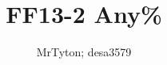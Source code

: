 \documentclass[dvipsnames]{report}
\title{FF13-2 Any\%}
\author{MrTyton; desa3579}
\begin{document}
\singlespacing
\maketitle
\begin{multicols}{2}
\tableofcontents
\end{multicols}

\makeatletter
\patchcmd{\chapter}{\if@openright\cleardoublepage\else\clearpage\fi}{}{}{}
\makeatother

\newcommand{\syn}{\textbf{\textcolor{purple}{SYN}}}
\newcommand{\sab}{\textbf{\textcolor{gray}{SAB}}}
\newcommand{\com}{\textbf{\textcolor{red}{COM}}}
\newcommand{\rav}{\textbf{\textcolor{blue}{RAV}}}
\newcommand{\sen}{\textbf{\textcolor{BurntOrange}{SEN}}}
\newcommand{\med}{\textbf{\textcolor{green}{MED}}}
\newcommand{\gah}{\textbf{\textcolor{purple}{Gahongas}}}
\newcommand{\chu}{\textbf{\textcolor{red}{Chichu}}}
\newcommand{\nek}{\textbf{\textcolor{blue}{Nekton}}}
\newcommand{\X}{\textbf{X}}
\newcommand{\W}{\textbf{W}}
\newcommand{\nada}{\textbf{-}}
\newcommand{\comb}{\com-buffered into}

\newenvironment{battle}[1]{\begin{tcolorbox}[title=\begin{center}#1\end{center},colbacktitle=red!50!white]}{\end{tcolorbox}}

\newenvironment{shop}[1]{\begin{tcolorbox}[title=\begin{center}SHOP\, #1 GIL\end{center},colbacktitle=blue!50!white]}{\end{tcolorbox}}

\newenvironment{upgrade}{\begin{tcolorbox}[title=\begin{center}UPGRADE\end{center},colbacktitle=purple!50!white]}{\end{tcolorbox}}

\newenvironment{menu}{\begin{tcolorbox}[title=\begin{center}MENU\end{center},colbacktitle=black!50!white]}{\end{tcolorbox}}
\end{document}
